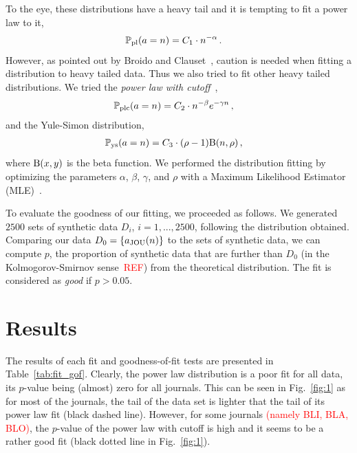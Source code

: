 \documentclass[aps,prl,floatfix,twocolumn]{revtex4-1}
\begin{document}
To the eye, these distributions have a heavy tail and it is tempting to fit a power law to it, 
\begin{align}\label{eq:pl}
 \mathbb{P}_{\rm pl}(a = n) &= C_1\cdot n^{-\alpha}\, .
\end{align}
However, as pointed out by Broido and Clauset~\cite{Bro19}, caution is needed when fitting a distribution to heavy tailed data. 
Thus we also tried to fit other heavy tailed distributions.
We tried the \emph{power law with cutoff}~\cite{Bro19}, 
\begin{align}\label{eq:plco}
 \mathbb{P}_{\rm plc}(a = n) &= C_2\cdot n^{-\beta}e^{-\gamma n}\, ,
\end{align} 
and the Yule-Simon distribution, 
\begin{align}\label{eq:yule}
 \mathbb{P}_{\rm ys}(a = n) &= C_3\cdot (\rho-1){\rm B}(n,\rho)\, ,
\end{align}
where ${\rm B}(x,y)$ is the beta function. 
We performed the distribution fitting by optimizing the parameters $\alpha$, $\beta$, $\gamma$, and $\rho$ with a Maximum Likelihood Estimator (MLE)~\cite{Cla09}. 

To evaluate the goodness of our fitting, we proceeded as follows. 
We generated $2500$ sets of synthetic data $D_i$, $i=1,...,2500$, following the distribution obtained. 
Comparing our data $D_0=\{a_{\rm JOU}(n)\}$ to the sets of synthetic data, we can compute $p$, the proportion of synthetic data that are further than $D_0$ 
(in the Kolmogorov-Smirnov sense~\textcolor{red}{REF}) from the theoretical distribution. 
The fit is considered as \emph{good} if $p>0.05$. 


\section{Results}
The results of each fit and goodness-of-fit tests are presented in Table~\ref{tab:fit_gof}. 
Clearly, the power law distribution is a poor fit for all data, its $p$-value being (almost) zero for all journals. 
This can be seen in Fig.~\ref{fig:1} as for most of the journals, the tail of the data set is lighter that the tail of its power law fit (black dashed line). 
However, for some journals \textcolor{red}{(namely BLI, BLA, BLO)}, the $p$-value of the power law with cutoff is high and it seems to be a rather good fit (black dotted line in Fig.~\ref{fig:1}). 
\end{document}
